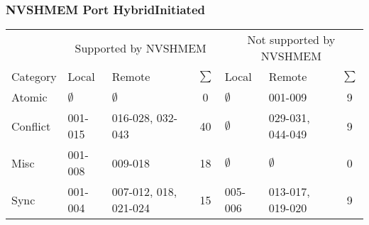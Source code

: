 \documentclass[a4paper,10pt]{article}
\newcommand{\es}{$\emptyset$}
\newcommand{\s}{$\sum$}
\begin{document}
\subsubsection*{NVSHMEM Port HybridInitiated}
\begin{tabular}{|l|l|l|c|l|l|c|} \hline
    & \multicolumn{3}{c}{Supported by NVSHMEM} & \multicolumn{3}{|c|}{Not supported by NVSHMEM} \\
    Category & Local & Remote & \s & Local & Remote & \s \\ \hline
    Atomic & \es & \es & 0 & \es & 001-009 & 9 \\
    Conflict & 001-015 & 016-028, 032-043 & 40 & \es & 029-031, 044-049 & 9 \\
    Misc & 001-008 & 009-018 & 18 & \es & \es & 0 \\
    Sync & 001-004 & 007-012, 018, 021-024 & 15 & 005-006 & 013-017, 019-020 & 9 \\ \hline
\end{tabular}
\end{document}
